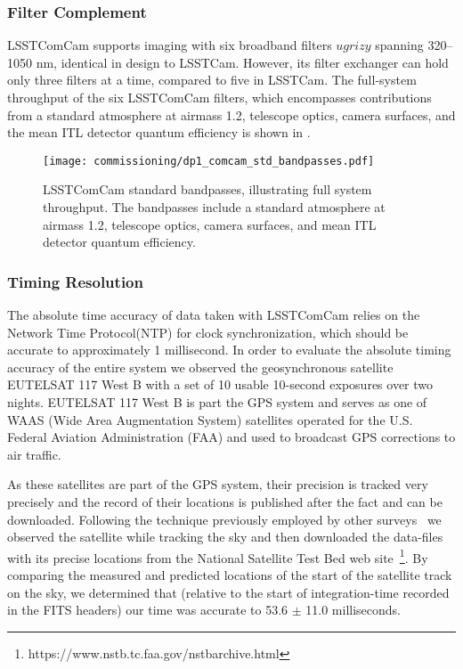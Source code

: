 \subsubsection{Filter Complement}
\label{sssec:comcam_filters}
\gls{LSSTComCam} supports imaging with six broadband filters $ugrizy$ spanning 320–1050 nm, identical in design to \gls{LSSTCam}.
However, its filter exchanger can hold only three filters at a time, compared to five in \gls{LSSTCam}.
The full-system throughput of the six \gls{LSSTComCam} filters, which encompasses contributions from a standard atmosphere at airmass 1.2, telescope optics, camera surfaces, and the mean \gls{ITL} detector quantum efficiency is shown in .
\begin{figure}[htb!]
\centering
\texttt{[image: commissioning/dp1\_comcam\_std\_bandpasses.pdf]}
\caption{LSSTComCam standard bandpasses, illustrating full system throughput. The bandpasses include a standard atmosphere at airmass 1.2, telescope optics, camera surfaces, and mean \gls{ITL} detector quantum efficiency.}
\label{fig:comcam_standard_bandpasses}
\vspace{0.1cm}
\end{figure}

\subsubsection{Timing Resolution}
\label{ssec:comcam_timing}

The absolute time accuracy of data taken with LSSTComCam relies on the Network Time Protocol(NTP) for clock synchronization, which should be accurate to approximately 1 millisecond. In order to evaluate the absolute timing accuracy of the entire system we observed the geosynchronous satellite EUTELSAT 117 West B with a set of 10 usable 10-second exposures over two nights.  EUTELSAT 117 West B is part the GPS system and serves as one of WAAS (Wide Area Augmentation System) satellites operated for the U.S. Federal Aviation Administration (FAA) and used to broadcast GPS corrections to air traffic.

As these satellites are part of the GPS system, their precision is tracked very precisely and the record of their locations is published after the fact and can be downloaded.  
Following the technique previously employed by other surveys~\citep{2018PASP..130f4505T} we observed the satellite while tracking the sky and then downloaded the data-files with its precise locations from the National Satellite Test Bed web site~\footnote{https://www.nstb.tc.faa.gov/nstbarchive.html}.  
By comparing the measured and predicted locations of the start of the satellite track on the sky, we determined that (relative to the start of integration-time recorded in the FITS headers) our time was accurate to 53.6 $\pm$ 11.0 milliseconds.

